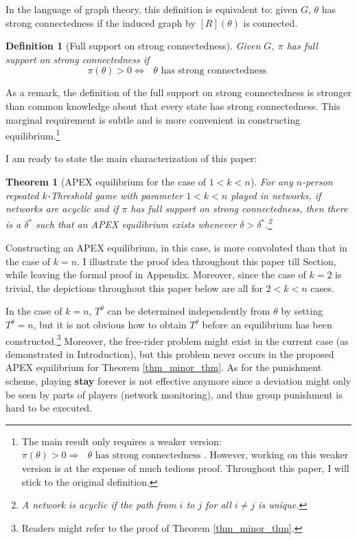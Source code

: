 \documentclass[12pt,letter]{article}
\newtheorem{theorem}{Theorem}
\newtheorem{definition}{Definition}[section]
\theoremstyle{definition}
\theoremstyle{remark}
\theoremstyle{claim}
\begin{document}
In the language of graph theory, this definition is equivalent to: given $G$, $\theta$ has strong connectedness if the induced graph by $[R](\theta)$ is connected.

\begin{definition}[Full support on strong connectedness]
Given $G$, $\pi$ has full support on strong connectedness if 
\[\pi(\theta)>0\Leftrightarrow \text{ $\theta$ has strong connectedness }\] 
\end{definition}  

As a remark, the definition of the full support on strong connectedness is stronger than common knowledge about that every state has strong connectedness. This marginal requirement is subtle and is more convenient in constructing equilibrium.\footnote{The main result only requires a weaker version: $\pi(\theta)>0\Rightarrow \text{ $\theta$ has strong connectedness }$. However, working on this weaker version is at the expense of much tedious proof. Throughout this paper, I will stick to the original definition.} 

I am ready to state the main characterization of this paper:
\begin{theorem}[APEX equilibrium for the case of $1<k<n$]
\label{thm_main_result}
For any $n$-person repeated $k$-Threshold game with parameter $1<k<n$ played in networks, if networks are acyclic and if $\pi$ has full support on strong connectedness, then there is a $\delta^{*}$ such that an APEX equilibrium exists whenever $\delta>\delta^{*}$.\footnote{A network is acyclic if the path from $i$ to $j$ for all $i\neq j$ is unique.}

\end{theorem}

Constructing an APEX equilibrium, in this case, is more convoluted than that in the case of $k=n$. I illustrate the proof idea throughout this paper till Section, while leaving the formal proof in Appendix. Moreover, since the case of $k=2$ is trivial, the depictions throughout this paper below are all for $2<k<n$ cases. 

In the case of $k=n$, $T^{\theta}$ can be determined independently from $\theta$ by setting $T^{\theta}=n$, but it is not obvious how to obtain $T^{\theta}$ before an equilibrium has been constructed.\footnote{Readers might refer to the proof of Theorem \ref{thm_minor_thm}.} 
Moreover, the free-rider problem might exist in the current case (as demonstrated in Introduction), but this problem never occurs in the proposed APEX equilibrium for Theorem \ref{thm_minor_thm}. As for the punishment scheme, playing \textbf{stay} forever is not effective anymore since a deviation might only be seen by parts of players (network monitoring), and thus group punishment is hard to be executed.
\end{document}
